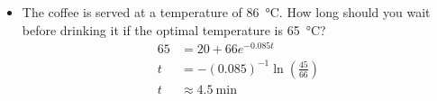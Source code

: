 \begin{itemize}
\begin{itemize}
      \item The coffee is served at a temperature of \SI{86}{\celsius}. How
        long should you wait before drinking it if the optimal temperature is
        \SI{65}{\celsius}?
        \begin{align*}
          65 &= 20 + 66e^{-0.085t} \\
          t &= -\left( 0.085 \right)^{-1} \ln \left( \frac{45}{66} \right) \\
          t &\approx 4.5 ~\text{min}
        \end{align*}



    \end{itemize}



\end{itemize}



